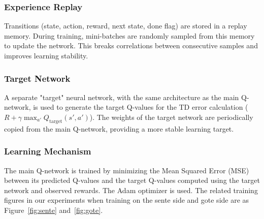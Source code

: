 \subsubsection{Experience Replay}
Transitions (state, action, reward, next state, done flag) are stored in a replay memory. During training, mini-batches are randomly sampled from this memory to update the network. This breaks correlations between consecutive samples and improves learning stability.

\subsubsection{Target Network}
A separate "target" neural network, with the same architecture as the main Q-network, is used to generate the target Q-values for the TD error calculation ($R + \gamma \max_{a'} Q_{\text{target}}(s',a')$). The weights of the target network are periodically copied from the main Q-network, providing a more stable learning target.

\subsubsection{Learning Mechanism} 
The main Q-network is trained by minimizing the Mean Squared Error (MSE) between its predicted Q-values and the target Q-values computed using the target network and observed rewards. The Adam optimizer is used.
The related training figures in our experiments when training on the sente side and gote side are as Figure~\ref{fig:sente} and~\ref{fig:gote}.